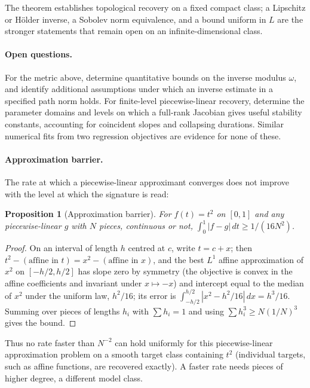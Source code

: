 \documentclass[11pt,english]{article}
\newtheorem{proposition}[theorem]{Proposition}
\theoremstyle{definition}
\theoremstyle{remark}
\begin{document}
The theorem establishes topological recovery on a fixed compact
class; a Lipschitz or H\"older inverse, a Sobolev norm equivalence,
and a bound uniform in $L$ are the stronger statements that remain
open on an infinite-dimensional class.

\paragraph{Open questions.}
For the metric above, determine quantitative bounds on the inverse
modulus $\omega$, and identify additional assumptions under which
an inverse estimate in a specified path norm holds. For finite-level
piecewise-linear recovery, determine the parameter domains and
levels on which a full-rank Jacobian gives useful stability
constants, accounting for coincident slopes and collapsing
durations. Similar numerical fits from two regression objectives are
evidence for none of these.


\paragraph{Approximation barrier.}
The rate at which a piecewise-linear approximant converges does not
improve with the level at which the signature is read:

\begin{proposition}[Approximation barrier]
\label{prop:barrier}
For $f(t)=t^{2}$ on $[0,1]$ and any piecewise-linear $g$ with $N$
pieces, continuous or not, $\int_{0}^{1}|f-g|\,dt\geq1/(16N^{2})$.
\end{proposition}

\begin{proof}
On an interval of length $h$ centred at $c$, write $t=c+x$; then
$t^{2}-(\text{affine in }t)=x^{2}-(\text{affine in }x)$, and the
best $L^{1}$ affine approximation of $x^{2}$ on $[-h/2,h/2]$ has slope
zero by symmetry (the objective is convex in the affine coefficients and
invariant under $x\mapsto-x$) and intercept equal to the median of
$x^{2}$ under the uniform law, $h^{2}/16$; its error is
$\int_{-h/2}^{h/2}|x^{2}-h^{2}/16|\,dx=h^{3}/16$. Summing over pieces
of lengths $h_{i}$ with $\sum h_{i}=1$ and using
$\sum h_{i}^{3}\geq N(1/N)^{3}$ gives the bound.
\end{proof}

Thus no rate faster than $N^{-2}$ can hold uniformly for this
piecewise-linear approximation problem on a smooth target class
containing $t^2$ (individual targets, such as affine functions, are
recovered exactly). A faster rate needs pieces of higher degree, a
different model class.
\end{document}
